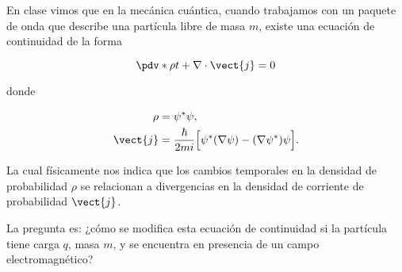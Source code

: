 \documentclass[../main.tex]{subfiles}
\begin{document}
\begin{problema}[20]
	En clase vimos que en la mecánica cuántica, cuando trabajamos con un
	paquete de onda que describe una partícula libre de masa \(m\), existe
	una ecuación de continuidad de la forma

	\begin{equation*}
		\pdv*{\rho}{t} + \nabla \cdot{\vect{j}} = 0
	\end{equation*}

	donde

	\begin{align*}
		\rho     & = \psi^{*}\psi ,                                                                 \\
		\vect{j} & = \dfrac{\hbar}{2mi}\Bigl[\psi^{*}(\nabla{\psi}) - (\nabla{\psi^{*}})\psi\Bigr].
	\end{align*}

	La cual físicamente nos indica que los cambios temporales en
	la densidad de probabilidad \(\rho\) se relacionan a divergencias
	en la densidad de corriente de probabilidad \(\vect{j}\).

	La pregunta es: ¿cómo se modifica esta ecuación de continuidad
	si la partícula tiene carga \(q\), masa \(m\), y se encuentra en
	presencia de un campo electromagnético?
\end{problema}
\end{document}
